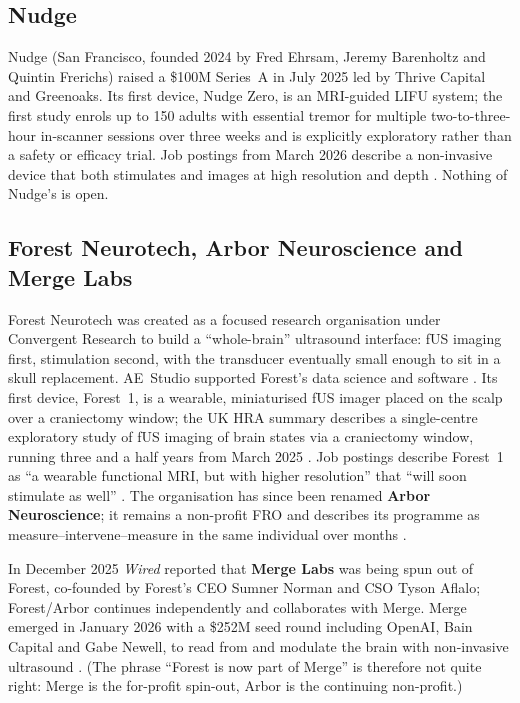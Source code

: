 \documentclass[11pt,a4paper]{article}
\begin{document}
\subsection{Nudge}

Nudge (San Francisco, founded 2024 by Fred Ehrsam, Jeremy Barenholtz and Quintin Frerichs) raised a \$100M Series~A in July 2025 led by Thrive Capital and Greenoaks. Its first device, Nudge Zero, is an MRI-guided LIFU system; the first study enrols up to 150 adults with essential tremor for multiple two-to-three-hour in-scanner sessions over three weeks and is explicitly exploratory rather than a safety or efficacy trial. Job postings from March 2026 describe a non-invasive device that both stimulates and images at high resolution and depth \cite{nudge}. Nothing of Nudge's is open.

\subsection{Forest Neurotech, Arbor Neuroscience and Merge Labs}

Forest Neurotech was created as a focused research organisation under Convergent Research to build a ``whole-brain'' ultrasound interface: fUS imaging first, stimulation second, with the transducer eventually small enough to sit in a skull replacement. AE~Studio supported Forest's data science and software \cite{aestudio}. Its first device, Forest~1, is a wearable, miniaturised fUS imager placed on the scalp over a craniectomy window; the UK HRA summary describes a single-centre exploratory study of fUS imaging of brain states via a craniectomy window, running three and a half years from March 2025 \cite{forest1}. Job postings describe Forest~1 as ``a wearable functional MRI, but with higher resolution'' that ``will soon stimulate as well'' \cite{arbor}. The organisation has since been renamed \textbf{Arbor Neuroscience}; it remains a non-profit FRO and describes its programme as measure--intervene--measure in the same individual over months \cite{arbor}.

In December 2025 \emph{Wired} reported that \textbf{Merge Labs} was being spun out of Forest, co-founded by Forest's CEO Sumner Norman and CSO Tyson Aflalo; Forest/Arbor continues independently and collaborates with Merge. Merge emerged in January 2026 with a \$252M seed round including OpenAI, Bain Capital and Gabe Newell, to read from and modulate the brain with non-invasive ultrasound \cite{merge}. (The phrase ``Forest is now part of Merge'' is therefore not quite right: Merge is the for-profit spin-out, Arbor is the continuing non-profit.)
\end{document}
